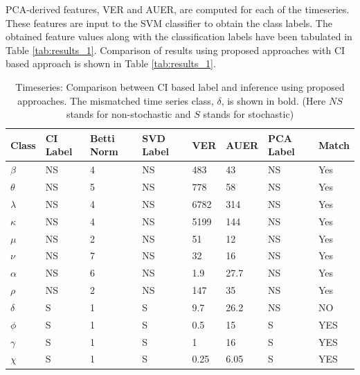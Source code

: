 \documentclass[journal]{IEEEtran}
\begin{document}
	PCA-derived features, VER and AUER, are computed for each of the timeseries. These features are input to the SVM classifier to obtain the class labels. The obtained feature values along with  the classification labels have been tabulated in Table \ref{tab:results_1}.
	Comparison of results using proposed approaches with CI based approach \cite{Adegoke2018} is shown in Table \ref{tab:results_1}.

	
	
	\begin{table}[t]
		\caption{Timeseries: Comparison between CI based label and inference using proposed approaches. The mismatched time series class, $\delta$, is shown in bold. (Here $NS$ stands for non-stochastic and $S$ stands for stochastic)}
		\begin{center}
			\begin{tabular}{|p{0.5cm}|p{0.75cm}|p{0.75cm}|p{0.75cm}|p{0.75cm}|p{1cm}|p{0.5cm}|p{0.75cm}|}
				\hline
				Class & CI \newline Label & Betti Norm & SVD \newline Label & VER & AUER & PCA \newline Label  &  Match \\
				\hline
				$\beta$ & NS & 4 & NS & 483 & 43 & NS & Yes\\
			\hline
				$\theta$  & NS &  5 & NS & 778 & 58 & NS  &  Yes \\
				\hline
			$\lambda$ & NS & 4 & NS & 6782 & 314 & NS & Yes \\
			\hline
				$\kappa$ & NS & 4 & NS & 5199 & 144 & NS & Yes \\
			\hline
		$\mu$ & NS & 2 & NS & 51 & 12 & NS & Yes \\
		\hline
			$\nu$ & NS & 7 & NS & 32 & 16 & NS & Yes \\
			\hline
$\alpha$ & NS & 6 & NS & 1.9 & 27.7 & NS & Yes \\
\hline
$\rho$ & NS & 2 & NS & 147 & 35 & NS & Yes \\
\hline
$\delta$ & S & 1 & S & 9.7 & 26.2 & NS & NO \\
\hline
$\phi$ & S & 1 & S & 0.5 & 15 & S & YES \\
\hline
$\gamma$ & S & 1 & S & 1 & 16 & S & YES \\
\hline
$\chi$ & S & 1 & S & 0.25 & 6.05 & S & YES \\

\end{tabular}
\end{center}
\end{table}
\end{document}
